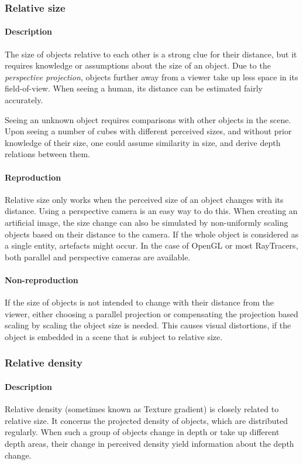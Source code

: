 \subsubsection{Relative size}
\paragraph{Description}
The size of objects relative to each other is a strong clue for their distance, but it requires knowledge or assumptions about the size of an object. Due to the \textit{perspective projection}, objects further away from a viewer take up less space in its field-of-view. When seeing a human, its distance can be estimated fairly accurately.

Seeing an unknown object requires comparisons with other objects in the scene. Upon seeing a number of cubes with different perceived sizes, and without prior knowledge of their size, one could assume similarity in size, and derive depth relations between them.

\paragraph{Reproduction}
Relative size only works when the perceived size of an object changes with its distance. Using a perspective camera is an easy way to do this. When creating an artificial image, the size change can also be simulated by non-uniformly scaling objects based on their distance to the camera. If the whole object is considered as a single entity, artefacts might occur. In the case of OpenGL or most RayTracers, both parallel and perspective cameras are available.

\paragraph{Non-reproduction}
If the size of objects is not intended to change with their distance from the viewer, either choosing a parallel projection or compensating the projection based scaling by scaling the object size is needed. This causes visual distortions, if the object is embedded in a scene that is subject to relative size.


\subsubsection{Relative density}
\paragraph{Description}
Relative density (sometimes known as Texture gradient) is closely related to relative size.
It concerns the projected density of objects, which are distributed regularly.
When such a group of objects change in depth or take up different depth areas, their change in perceived density yield information about the depth change.

